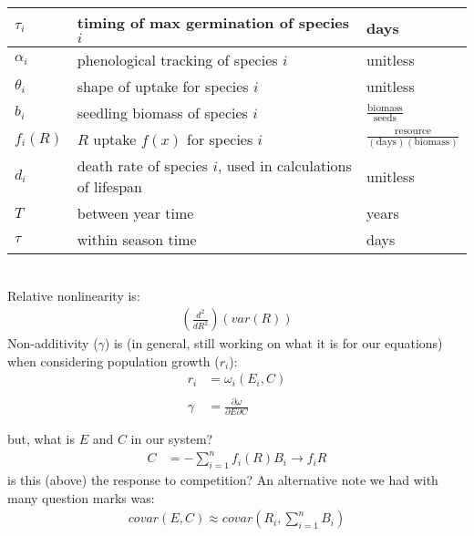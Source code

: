 \documentclass[11pt,a4paper,oneside]{article}
\begin{document}
\begin{center}
\begin{table}[h!]
\begin{tabular}{ | p{3.0cm} | p{6.0cm} | p{4.0cm} |}
\(\tau_{i}\) & timing of max germination of species \(i\) & days \\ \hline
\(\alpha_{i}\) & phenological tracking of species \(i\) & unitless \\ \hline
\(\theta_{i}\) & shape of uptake for species \(i\) & unitless\\ \hline
\hline
\(b_{i}\) & seedling biomass of species \(i\) & \(\frac{\text{biomass}}{\text{seeds}}\) \\ \hline
\(f_{i}(R)\) & \(R\) uptake \(f(x)\) for species \(i\) & \(\frac{\text{resource}}{(\text{days})(\text{biomass})}\)\\ \hline
\(d_{i}\) & death rate of species \(i\), used in calculations of lifespan & unitless \\ \hline
\(T\) & between year time & years \\ \hline
\(\tau\) & within season time & days \\ \hline
\hline
\end{tabular}
\end{table}
\end{center}


\newpage
{}\\
\noindent Relative nonlinearity is:
\begin{align*}
\left(\frac{d^{2}}{dR^{2}}\right)(var(R))
\end{align*}
\noindent Non-additivity (\(\gamma\)) is (in general, still working on
what it is for our equations) when considering population growth
(\(r_{i}\)):
\begin{align*}
r_{i} & = \omega_{i}(E_{i}, C)
\\
\\
\gamma & = \frac{\partial \omega}{\partial E \partial C} 
\end{align*}

\noindent but, what is \(E\) and \(C\) in our system?
\begin{align*}
C & = - \sum_{i=1}^{n}f_{i}(R)B_{i} \rightarrow f_{i}R
\end{align*}
\noindent is this (above) the response to
  competition? An alternative note we had with many question marks
  was:
\begin{align*}
covar(E,C) \approx covar\left(R_{i}, \sum_{i=1}^{n}B_{i}\right)
\end{align*}

\newpage


\end{document}
